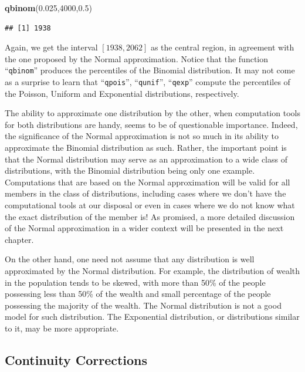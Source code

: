 \documentclass[]{krantz}
\makeatletter
\newenvironment{Shaded}{\begin{snugshade}}{\end{snugshade}}
\newcommand{\KeywordTok}[1]{\textcolor[rgb]{0.13,0.29,0.53}{\textbf{#1}}}
\newcommand{\DecValTok}[1]{\textcolor[rgb]{0.00,0.00,0.81}{#1}}
\newcommand{\FloatTok}[1]{\textcolor[rgb]{0.00,0.00,0.81}{#1}}
\newcommand{\NormalTok}[1]{#1}
\newenvironment{kframe}{%
\medskip{}
\setlength{\fboxsep}{.8em}
 \def\at@end@of@kframe{}%
 \ifinner\ifhmode%
  \def\at@end@of@kframe{\end{minipage}}%
  \begin{minipage}{\columnwidth}%
 \fi\fi%
 \def\FrameCommand##1{\hskip\@totalleftmargin \hskip-\fboxsep
 \colorbox{shadecolor}{##1}\hskip-\fboxsep
     \hskip-\linewidth \hskip-\@totalleftmargin \hskip\columnwidth}%
 \MakeFramed {\advance\hsize-\width
   \@totalleftmargin\z@ \linewidth\hsize
   \@setminipage}}%
 {\par\unskip\endMakeFramed%
 \at@end@of@kframe}
\renewenvironment{Shaded}{\begin{kframe}}{\end{kframe}}
\theoremstyle{definition}
\theoremstyle{definition}
\theoremstyle{definition}
\theoremstyle{remark}
\makeatother
\begin{document}
\begin{Shaded}
\begin{Highlighting}[]
\KeywordTok{qbinom}\NormalTok{(}\FloatTok{0.025}\NormalTok{,}\DecValTok{4000}\NormalTok{,}\FloatTok{0.5}\NormalTok{)}
\end{Highlighting}
\end{Shaded}

\begin{verbatim}
## [1] 1938
\end{verbatim}

Again, we get the interval \([1938,2062]\) as the central region, in
agreement with the one proposed by the Normal approximation. Notice that
the function ``\texttt{qbinom}'' produces the percentiles of the
Binomial distribution. It may not come as a surprise to learn that
``\texttt{qpois}'', ``\texttt{qunif}'', ``\texttt{qexp}'' compute the
percentiles of the Poisson, Uniform and Exponential distributions,
respectively.

The ability to approximate one distribution by the other, when
computation tools for both distributions are handy, seems to be of
questionable importance. Indeed, the significance of the Normal
approximation is not so much in its ability to approximate the Binomial
distribution as such. Rather, the important point is that the Normal
distribution may serve as an approximation to a wide class of
distributions, with the Binomial distribution being only one example.
Computations that are based on the Normal approximation will be valid
for all members in the class of distributions, including cases where we
don't have the computational tools at our disposal or even in cases
where we do not know what the exact distribution of the member is! As
promised, a more detailed discussion of the Normal approximation in a
wider context will be presented in the next chapter.

On the other hand, one need not assume that any distribution is well
approximated by the Normal distribution. For example, the distribution
of wealth in the population tends to be skewed, with more than 50\% of
the people possessing less than 50\% of the wealth and small percentage
of the people possessing the majority of the wealth. The Normal
distribution is not a good model for such distribution. The Exponential
distribution, or distributions similar to it, may be more appropriate.

\subsection{Continuity Corrections}\label{continuity-corrections}
\end{document}
